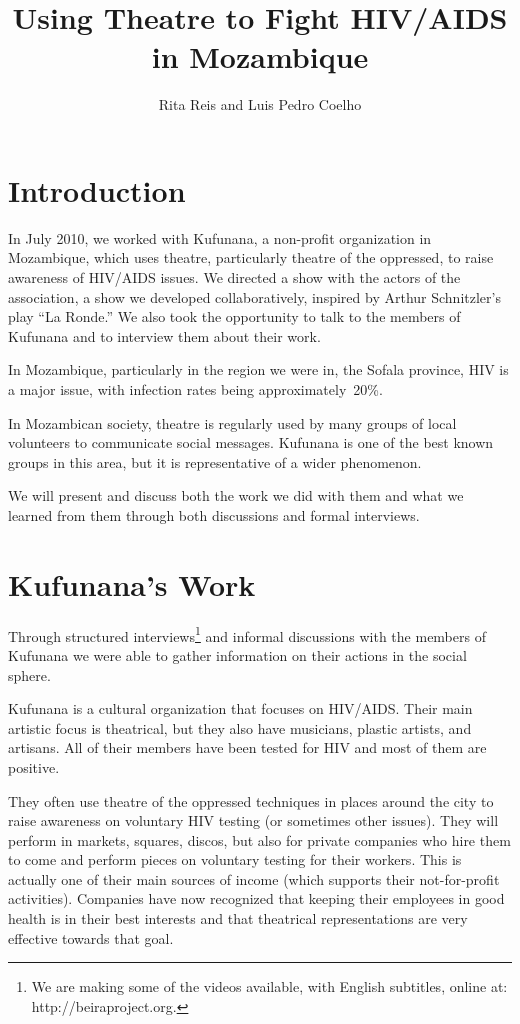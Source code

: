 \documentclass[article,twocolumn]{memoir}
\title{Using Theatre to Fight HIV/AIDS in Mozambique}
\author{Rita Reis and Luis Pedro Coelho}
\date{}
\begin{document}
\maketitle

\chapter{Introduction}

In July 2010, we worked with Kufunana, a non-profit organization in Mozambique,
which uses theatre, particularly theatre of the oppressed, to raise awareness
of HIV/AIDS issues. We directed a show with the actors of the association, a
show we developed collaboratively, inspired by Arthur Schnitzler's play ``La
Ronde.'' We also took the opportunity to talk to the members of Kufunana and to
interview them about their work.

In Mozambique, particularly in the region we were in, the Sofala province, HIV
is a major issue, with infection rates being approximately~20\%.

In Mozambican society, theatre is regularly used by many groups of local
volunteers to communicate social messages. Kufunana is one of the best known
groups in this area, but it is representative of a wider phenomenon.

We will present and discuss both the work we did with them and what we learned
from them through both discussions and formal interviews.

\chapter{Kufunana's Work}

Through structured interviews\footnote{We are making some of the videos
available, with English subtitles, online at: http://beiraproject.org.} and
informal discussions with the members of Kufunana we were able to gather
information on their actions in the social sphere.

Kufunana is a cultural organization that focuses on HIV/AIDS. Their main
artistic focus is theatrical, but they also have musicians, plastic artists,
and artisans. All of their members have been tested for HIV and most of them are
positive.

They often use theatre of the oppressed techniques in places around the city to
raise awareness on voluntary HIV testing (or sometimes other issues). They will
perform in markets, squares, discos, but also for private companies who hire
them to come and perform pieces on voluntary testing for their workers. This is
actually one of their main sources of income (which supports their
not-for-profit activities). Companies have now recognized that keeping their
employees in good health is in their best interests and that theatrical
representations are very effective towards that goal.
\end{document}
